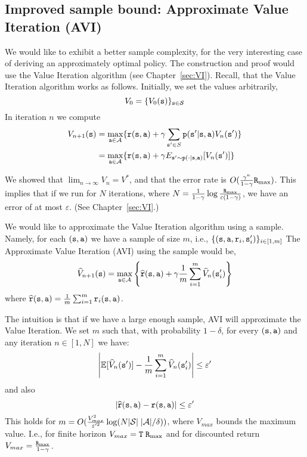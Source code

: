 \subsection{Improved sample bound: Approximate Value
Iteration (AVI)}

We would like to exhibit a better sample complexity, for the very
interesting case of deriving an approximately optimal policy. The
construction and proof would use the Value Iteration algorithm (see
Chapter~\ref{sec:VI}).
%
Recall, that the Value Iteration algorithm works as follows.
Initially, we set the values arbitrarily,
\[
V_0=\{V_0({\tt s})\}_{{\tt s} \in \mathcal{S}}
\]
In iteration $n$ we compute
\begin{align*}
V_{n+1}({\tt s})&=\max_{{\tt a}\in \mathcal{A}} \{
{\tt r}({\tt s},{\tt a})+\gamma \sum_{{\tt s}'\in S}
{\tt p}({\tt s}'|{\tt s},{\tt a})
V_n({\tt s}')\}\\
&=\max_{{\tt a}\in \mathcal{A}} \{ {\tt r}({\tt s},{\tt a})+\gamma
E_{{\tt s}'\sim {\tt p}(\cdot |{\tt s},{\tt a})} [V_n({\tt s}')]\}
\end{align*}

We showed that $\lim_{n\rightarrow \infty}V_n =V^*$, and that the
error rate is $O(\frac{\gamma^n}{1-\gamma}{\tt R}_{\max })$.
%
This implies that if we run for $N$ iterations, where
$N=\frac{1}{1-\gamma}\log
\frac{{\tt R}_{\max }}{\varepsilon(1-\gamma)}$, we have an error of at most
$\varepsilon$. (See Chapter~\ref{sec:VI}.)


We would like to approximate the Value Iteration algorithm using a
sample. Namely, for each $({\tt s},{\tt a})$ we have a sample of size
$m$, i.e., $\{({\tt s},{\tt a},{\tt r}_i,{\tt s}'_i)\}_{i\in[1,m]}$
The Approximate Value Iteration (AVI) using the sample would be,
\[
\widehat{V}_{n+1}({\tt s})=\max_{{\tt a}\in \mathcal{A}} \left\{
\widehat{{\tt r}}({\tt s},{\tt a})+\gamma \frac{1}{m}\sum_{i=1}^m
\widehat{V}_n({\tt s}'_i)\right\}
\]
where $\widehat{{\tt r}}({\tt s},{\tt a})=\frac{1}{m}\sum_{i=1}^m {\tt r}_i({\tt s},{\tt a})$.

The intuition is that if we have a large enough sample, AVI  will
approximate the Value Iteration. We set $m$ such that, with
probability $1-\delta$, for every $({\tt s},{\tt a})$ and any
iteration $n\in[1,N]$ we have:
\[
\left|\mathbb{E}[\widehat{V}_n({\tt s}')]-\frac{1}{m}\sum_{i=1}^m
\widehat{V}_n({\tt s}'_i)\right|\leq \varepsilon'
\]
and also
\[
\left|\widehat{{\tt r}}({\tt s},{\tt a})-{\tt r}({\tt s},{\tt a})\right|\leq\varepsilon'
\]
This holds for $m=O(\frac{V^2_{max}}{\varepsilon'^2}\log (N
|\mathcal{S}|\;|\mathcal{A}|/\delta))$, where $V_{max}$ bounds the maximum
value. I.e., for finite horizon $V_{max}={\tt T}\; {\tt R}_{\max }$ and for
discounted return $V_{max}=\frac{{\tt R}_{\max }}{1-\gamma}$.


